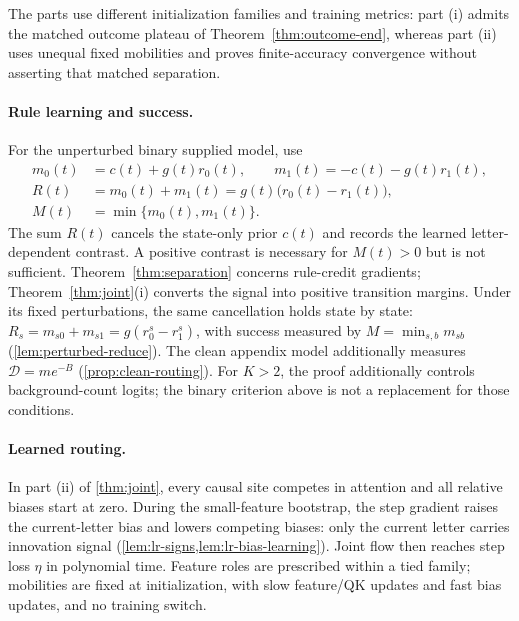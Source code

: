 The parts use different initialization families and training metrics:
part (i) admits the matched outcome plateau of Theorem~\ref{thm:outcome-end},
whereas part (ii) uses unequal fixed mobilities and proves finite-accuracy
convergence without asserting that matched separation.

\paragraph{Rule learning and success.}
For the unperturbed binary supplied model, use
\begin{equation}\label{eq:binary-rule-observables}
 \begin{aligned}
 m_0(t)&=c(t)+g(t)r_0(t),\qquad m_1(t)=-c(t)-g(t)r_1(t),\\
 R(t)&=m_0(t)+m_1(t)=g(t)\bigl(r_0(t)-r_1(t)\bigr),\\
 M(t)&=\min\{m_0(t),m_1(t)\}.
 \end{aligned}
\end{equation}
The sum $R(t)$ cancels the state-only prior $c(t)$ and records the learned
letter-dependent contrast. A positive contrast is necessary for $M(t)>0$
but is not sufficient. Theorem~\ref{thm:separation} concerns rule-credit gradients;
Theorem~\ref{thm:joint}(i) converts the signal into positive transition margins.
Under its fixed perturbations, the same cancellation holds state by state:
$R_s=m_{s0}+m_{s1}=g(r^s_0-r^s_1)$, with success measured by
$M=\min_{s,b}m_{sb}$ (\cref{lem:perturbed-reduce}).
The clean appendix model additionally measures $\mathcal D=me^{-B}$
(\cref{prop:clean-routing}).
For $K>2$, the proof additionally controls background-count logits;
the binary criterion above is not a replacement for those conditions.

\paragraph{Learned routing.}
In part (ii) of \cref{thm:joint}, every causal site competes in attention
and all relative biases start at zero. During the small-feature bootstrap, the step gradient raises
the current-letter bias and lowers competing biases: only the current letter carries innovation
signal (\cref{lem:lr-signs,lem:lr-bias-learning}). Joint flow then reaches step loss $\eta$ in
polynomial time. Feature roles are prescribed within a tied family; mobilities are fixed at
initialization, with slow feature/QK updates and fast bias updates, and no training switch.

